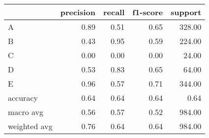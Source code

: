 \begin{tabular}{|l|r|r|r|r|}
\hline
{} &  precision &  recall &  f1-score &  support \\
\hline
A            &       0.89 &    0.51 &      0.65 &   328.00 \\
B            &       0.43 &    0.95 &      0.59 &   224.00 \\
C            &       0.00 &    0.00 &      0.00 &    24.00 \\
D            &       0.53 &    0.83 &      0.65 &    64.00 \\
E            &       0.96 &    0.57 &      0.71 &   344.00 \\
accuracy     &       0.64 &    0.64 &      0.64 &     0.64 \\
macro avg    &       0.56 &    0.57 &      0.52 &   984.00 \\
weighted avg &       0.76 &    0.64 &      0.64 &   984.00 \\
\hline
\end{tabular}
